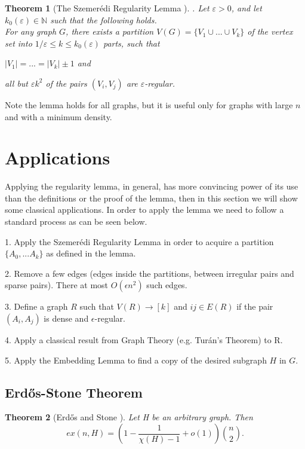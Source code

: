\documentclass[12pt,twoside,a4paper]{book}
\numberwithin{equation}{section}
\newtheorem{theorem}             {Theorem}[section]
\theoremstyle{remark}
\begin{document}
\begin{theorem}[{The Szemerédi Regularity Lemma \cite{Sz75}}]. Let $\varepsilon > 0$, and let $k_0(\varepsilon) \in  \mathbb{N}$ such that the following holds.\\
For any graph $G$, there exists a partition $V(G) = \{V_1 \cup ... \cup V_k\}$ of the vertex set into $1/ \varepsilon \leq k \leq k_0 (\varepsilon)$ parts, such that

$|V_1| = ... =|V_k| \pm 1$ and


all but $\varepsilon k^2$ of the pairs $(V_i, V_j)$ are $\varepsilon$-regular. 
\end{theorem}

Note the lemma holds for all graphs, but it is useful only for graphs with large $n$ and with a minimum density.%

\section{Applications}
Applying the regularity lemma, in general, has more convincing power of its use than the definitions or the proof of the lemma, then in this section we will show some classical applications. In order to apply the lemma we need to follow a standard process as can be seen below.

1. Apply the Szemerédi Regularity Lemma in order to acquire a partition $ \{ A_0, ... A_k \} $ as defined in the lemma.

2. Remove a few edges (edges inside the partitions, between irregular pairs and sparse pairs). There at most $O(\epsilon n^2)$ such edges.

3. Define a graph $R$ such that $V(R) \rightarrow [k]$ and $ij \in E(R) $ if  the pair $(A_i, A_j)$ is dense and $\epsilon$-regular.

4. Apply a classical result from Graph Theory (e.g. Turán's Theorem) to R.

5. Apply the Embedding Lemma to find a copy of the desired subgraph $H$ in $G$.
\subsection{Erd\H{o}s-Stone Theorem}

\begin{theorem}[{Erd\H{o}s and Stone \cite{ErSt46}}] Let H be an arbitrary graph. Then
$$ ex(n,H) = \left(1-\frac{1}{\chi (H)-1} + o(1)\right) \binom{n}{2}.$$ 
\end{theorem}
\end{document}
